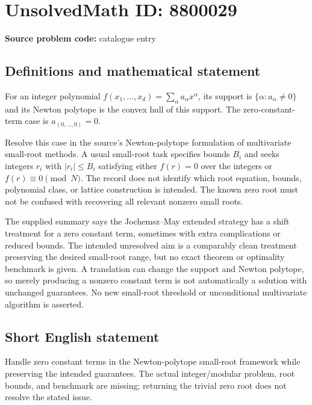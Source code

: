 \documentclass[11pt]{article}
\begin{document}
\section*{UnsolvedMath ID: 8800029}
\textbf{Source problem code:} catalogue entry
\subsection{Definitions and mathematical statement}
For an integer polynomial $f(x_1,\ldots,x_d)=\sum_\alpha a_\alpha x^\alpha$, its support is $\{\alpha:a_\alpha\ne0\}$ and its Newton polytope is the convex hull of this support. The zero-constant-term case is $a_{(0,\ldots,0)}=0$.

Resolve this case in the source's Newton-polytope formulation of multivariate small-root methods. A usual small-root task specifies bounds $B_i$ and seeks integers $r_i$ with $|r_i|\leq B_i$ satisfying either $f(r)=0$ over the integers or $f(r)\equiv0\pmod N$. The record does not identify which root equation, bounds, polynomial class, or lattice construction is intended. The known zero root must not be confused with recovering all relevant nonzero small roots.

The supplied summary says the Jochemsz--May extended strategy has a shift treatment for a zero constant term, sometimes with extra complications or reduced bounds. The intended unresolved aim is a comparably clean treatment preserving the desired small-root range, but no exact theorem or optimality benchmark is given. A translation can change the support and Newton polytope, so merely producing a nonzero constant term is not automatically a solution with unchanged guarantees. No new small-root threshold or unconditional multivariate algorithm is asserted.
\subsection{Short English statement}
Handle zero constant terms in the Newton-polytope small-root framework while preserving the intended guarantees. The actual integer/modular problem, root bounds, and benchmark are missing; returning the trivial zero root does not resolve the stated issue.
\end{document}
